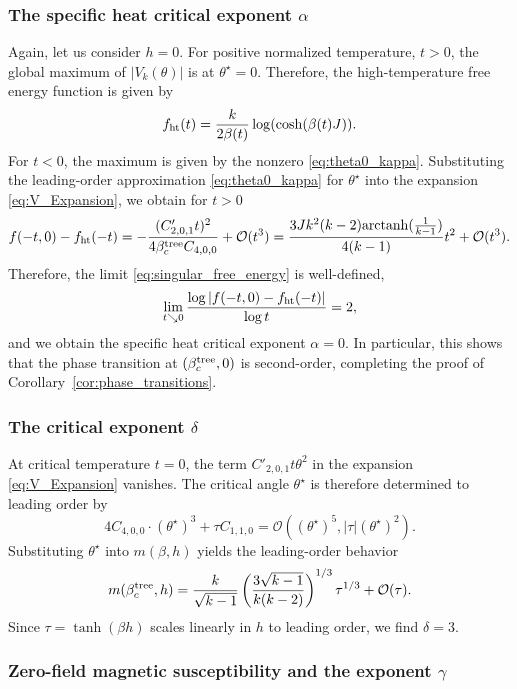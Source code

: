 \documentclass{article}
\numberwithin{theorem}{section}
\theoremstyle{remark}
\begin{document}
\subsubsection{The specific heat critical exponent \texorpdfstring{$\alpha$}{α}}
\label{par:alpha_exponent}

Again, let us consider $h=0$. For positive normalized temperature, $t>0$, the global maximum of $|V_k(\theta)|$ is at $\theta^\star = 0$. Therefore, the high-temperature free energy function is given by 
\[
  f_{\rm ht}(t) = \frac{k}{2\beta(t)} \log(\cosh(\beta(t) J)).
\]
For $t < 0$, the maximum is given by the nonzero \eqref{eq:theta0_kappa}. Substituting the leading-order approximation \eqref{eq:theta0_kappa} for $\theta^\star$ into the expansion \eqref{eq:V_Expansion}, we obtain for $t>0$
\[
  f(-t,0) - f_{\rm ht}(-t) = -\frac{(C'_{2,0,1} t)^2}{4\beta_c^{\rm tree} C_{4,0,0}} + \mathcal{O}(t^3)=\frac{3Jk^2(k-2)\mathrm{arctanh}(\frac1{k-1})}{4(k-1)}t^2 + \mathcal{O}(t^3).
\]
Therefore, the limit \eqref{eq:singular_free_energy} is well-defined,
\[
  \lim_{t \searrow 0} \frac{\log \left| f(-t,0) - f_{\rm ht}(-t) \right|}{\log t} = 2,
\] 
and we obtain the specific heat critical exponent $\alpha=0$. In particular, this shows that the phase transition at $(\beta_c^{\rm tree},0)$ is second-order, completing the proof of Corollary~\ref{cor:phase_transitions}.


\subsubsection{The critical exponent \texorpdfstring{$\delta$}{δ}}

At critical temperature $t = 0$, the term $C'_{2,0,1} t\theta^2$ in the expansion \eqref{eq:V_Expansion} vanishes. The critical angle $\theta^\star$ is therefore determined to leading order by
\[    
  4 C_{4,0,0} \cdot (\theta^\star)^3 + \tau C_{1,1,0} = \mathcal{O}((\theta^\star)^5, |\tau|(\theta^\star)^2).
\]
Substituting $\theta^\star$ into $m(\beta,h)$ yields the leading-order behavior
\[    
  m(\beta_c^{\rm tree},h) = \frac{k}{\sqrt{k-1}} \left( \frac{3\sqrt{k-1}}{k(k-2)} \right)^{1/3} \tau^{1/3} + \mathcal{O}(\tau).
\]
Since $\tau = \tanh(\beta h)$ scales linearly in $h$ to leading order, we find $\delta=3$.


\subsubsection{Zero-field magnetic susceptibility and the exponent \texorpdfstring{$\gamma$}{γ}}
\end{document}
